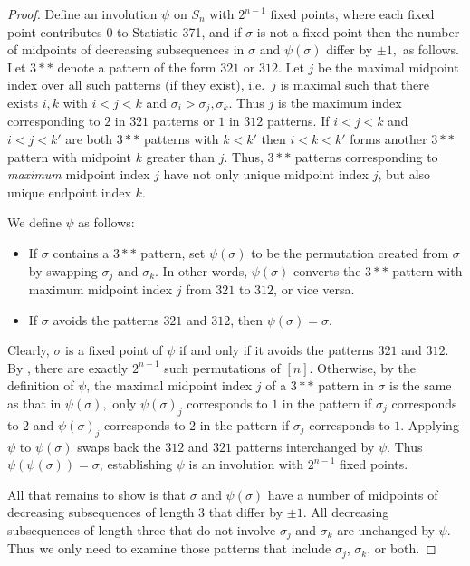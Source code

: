 \documentclass{amsart}
\theoremstyle{definition}
\begin{document}
\begin{proof}
  Define an involution $\psi$ on $S_n$ with $2^{n-1}$ fixed points, where each fixed point contributes 0 to Statistic 371, and if $\sigma$ is not a fixed point then the number of midpoints of decreasing subsequences in $\sigma$ and $\psi(\sigma)$ differ by $\pm 1,$ as follows.  Let $3**$ denote a pattern of the form $321$ or $312$. Let $j$ be the maximal midpoint index over all such patterns (if they exist), i.e.\ $j$  is maximal such that there exists $i, k$ with $i < j < k$ and $\sigma_i > \sigma_j , \sigma_k$. Thus $j$ is the maximum index corresponding to $2$ in $321$ patterns or $1$ in $312$ patterns. If $i<j<k$ and $i<j<k'$ are both $3**$ patterns with $k<k'$ then $i<k<k'$ forms another $3**$ pattern with midpoint $k$ greater than $j$.  Thus, $3**$ patterns corresponding to \emph{maximum} midpoint index $j$ have not only unique midpoint index $j$, but also unique endpoint index $k$.

  We define $\psi$ as follows:
  \begin{itemize}
    \item If $\sigma$ contains a $3**$ pattern, set $\psi(\sigma)$ to be the permutation created from $\sigma$ by swapping $\sigma_j$ and $\sigma_k$.  In other words, $\psi(\sigma)$ converts the $3**$ pattern with maximum midpoint index $j$ from $321$ to $312$, or vice versa.
    \item If $\sigma$ avoids the patterns  $321$ and $312$, then $\psi(\sigma) = \sigma$.
  \end{itemize}


  Clearly, $\sigma$ is a fixed point of $\psi$ if and only if it avoids the patterns $321$ and $312$.  By \cite{SimionSchmidt}, there are exactly $2^{n-1}$ such permutations of $[n]$.   Otherwise, by the definition of $\psi$, the maximal midpoint index $j$ of a $3**$ pattern in $\sigma$ is the same as that in $\psi(\sigma),$  only $\psi(\sigma)_j$ corresponds to $1$ in the pattern if $\sigma_j$ corresponds to $2$ and $\psi(\sigma)_j$ corresponds to $2$ in the pattern if $\sigma_j$ corresponds to $1.$  Applying $\psi$ to $\psi(\sigma)$ swaps back the $312$ and $321$ patterns interchanged by $\psi$.  Thus $\psi(\psi(\sigma))=\sigma$, establishing $\psi$ is an involution with $2^{n-1}$ fixed points.

  All that remains to show is that $\sigma$ and $\psi(\sigma)$ have a number of midpoints of decreasing subsequences of length $3$ that differ by $\pm 1$. All decreasing subsequences of length three that do not involve $\sigma_j$ and $\sigma_k$ are unchanged by $\psi.$  Thus we only need to examine those patterns that include $\sigma_j$, $\sigma_k$, or both.


\end{proof}
\end{document}
